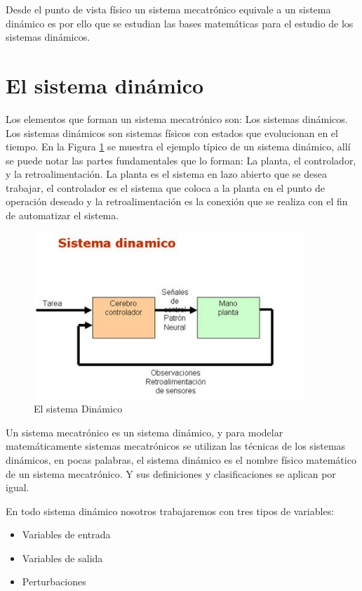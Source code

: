 \documentclass[12pt]{book}
\theoremstyle{definition}
\theoremstyle{remark}
\theoremstyle{plain}
\begin{document}
Desde el punto de vista físico un sistema mecatrónico equivale a un sistema dinámico es por ello que se estudian las bases matemáticas para el estudio de los sistemas dinámicos.

\section{El sistema dinámico}

Los elementos que forman un sistema mecatrónico son: Los sistemas dinámicos. Los sistemas dinámicos son sistemas físicos con estados que evolucionan en el tiempo. En la Figura \ref{fig006} se muestra el ejemplo típico de un sistema dinámico, allí se puede notar las partes fundamentales que lo forman: La planta, el controlador, y la retroalimentación. La planta es el sistema en lazo abierto que se desea trabajar, el controlador es el sistema que coloca a la planta en el punto de operación deseado y la retroalimentación es la conexión que se realiza  con el fin de automatizar el sistema.

\begin{figure}
\centering
\includegraphics[width=4in]{sistemadinamico.jpg}
\caption{El sistema Dinámico}
\label{fig006}
\end{figure}

Un sistema mecatrónico es un sistema dinámico, y para modelar matemáticamente sistemas mecatrónicos se utilizan las técnicas de los sistemas dinámicos, en pocas palabras, el sistema dinámico es el nombre físico matemático de un sistema mecatrónico. Y sus definiciones y clasificaciones se aplican por igual.

En todo sistema dinámico nosotros trabajaremos con tres tipos de variables:
\begin{itemize}
\item Variables de entrada
\item Variables de salida
\item Perturbaciones
\end{itemize}
\end{document}
